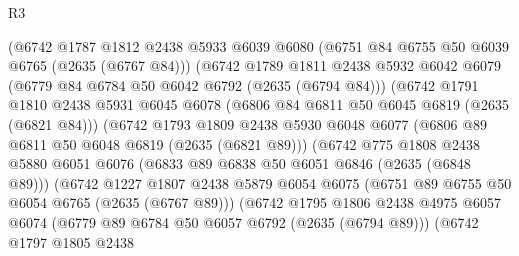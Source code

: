 \begin{lexlean}{R3}
\begin{coremodule}
                        (@6742
                          @1787
                          @1812
                          @2438
                          @5933
                          @6039
                          @6080
                          (@6751 @84 @6755 @50 @6039 @6765 (@2635 (@6767 @84)))
                          (@6742
                            @1789
                            @1811
                            @2438
                            @5932
                            @6042
                            @6079
                            (@6779 @84 @6784 @50 @6042 @6792 (@2635 (@6794 @84)))
                            (@6742
                              @1791
                              @1810
                              @2438
                              @5931
                              @6045
                              @6078
                              (@6806 @84 @6811 @50 @6045 @6819 (@2635 (@6821 @84)))
                              (@6742
                                @1793
                                @1809
                                @2438
                                @5930
                                @6048
                                @6077
                                (@6806 @89 @6811 @50 @6048 @6819 (@2635 (@6821 @89)))
                                (@6742
                                  @775
                                  @1808
                                  @2438
                                  @5880
                                  @6051
                                  @6076
                                  (@6833 @89 @6838 @50 @6051 @6846 (@2635 (@6848 @89)))
                                  (@6742
                                    @1227
                                    @1807
                                    @2438
                                    @5879
                                    @6054
                                    @6075
                                    (@6751 @89 @6755 @50 @6054 @6765 (@2635 (@6767 @89)))
                                    (@6742
                                      @1795
                                      @1806
                                      @2438
                                      @4975
                                      @6057
                                      @6074
                                      (@6779 @89 @6784 @50 @6057 @6792 (@2635 (@6794 @89)))
                                      (@6742
                                        @1797
                                        @1805
                                        @2438

\end{coremodule}
\end{lexlean}
